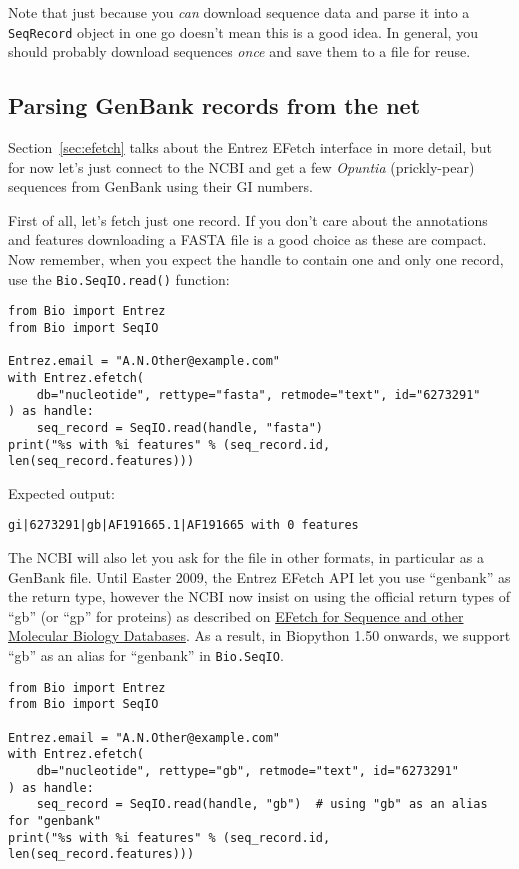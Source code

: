 Note that just because you \emph{can} download sequence data and parse it into
a \verb|SeqRecord| object in one go doesn't mean this is a good idea.
In general, you should probably download sequences \emph{once} and save them to
a file for reuse.

\subsection{Parsing GenBank records from the net}
\label{sec:SeqIO_GenBank_Online}
Section~\ref{sec:efetch} talks about the Entrez EFetch interface in more detail,
but for now let's just connect to the NCBI and get a few \textit{Opuntia} (prickly-pear)
sequences from GenBank using their GI numbers.

First of all, let's fetch just one record.  If you don't care about the
annotations and features downloading a FASTA file is a good choice as these
are compact.  Now remember, when you expect the handle to contain one and
only one record, use the \verb|Bio.SeqIO.read()| function:

\begin{verbatim}
from Bio import Entrez
from Bio import SeqIO

Entrez.email = "A.N.Other@example.com"
with Entrez.efetch(
    db="nucleotide", rettype="fasta", retmode="text", id="6273291"
) as handle:
    seq_record = SeqIO.read(handle, "fasta")
print("%s with %i features" % (seq_record.id, len(seq_record.features)))
\end{verbatim}

\noindent Expected output:

\begin{verbatim}
gi|6273291|gb|AF191665.1|AF191665 with 0 features
\end{verbatim}

The NCBI will also let you ask for the file in other formats, in particular as
a GenBank file. Until Easter 2009, the Entrez EFetch API let you use ``genbank''
as the return type, however the NCBI now insist on using the official
return types of ``gb'' (or ``gp'' for proteins) as described on
\href{https://www.ncbi.nlm.nih.gov/books/NBK3837/}
{EFetch for Sequence and other Molecular Biology Databases}.
As a result, in Biopython 1.50 onwards, we support ``gb'' as an
alias for ``genbank'' in \verb|Bio.SeqIO|.

\begin{verbatim}
from Bio import Entrez
from Bio import SeqIO

Entrez.email = "A.N.Other@example.com"
with Entrez.efetch(
    db="nucleotide", rettype="gb", retmode="text", id="6273291"
) as handle:
    seq_record = SeqIO.read(handle, "gb")  # using "gb" as an alias for "genbank"
print("%s with %i features" % (seq_record.id, len(seq_record.features)))
\end{verbatim}

